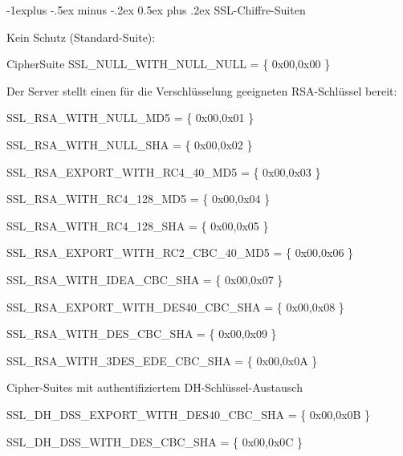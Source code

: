 \documentclass[a4paper]{article}
\makeatletter
\renewcommand{\subsection}{\@startsection{subsection}{2}{0mm}%
 {-1explus -.5ex minus -.2ex}%
 {0.5ex plus .2ex}%
 {\normalfont\normalsize\bfseries}}
\makeatother
\begin{document}
\begin{multicols}{3}
\begin{itemize*}
            \subsection{SSL-Chiffre-Suiten}
            \begin{itemize*}
                  \item       Kein Schutz (Standard-Suite):
                  \begin{itemize*}
                        \item CipherSuite SSL\_NULL\_WITH\_NULL\_NULL = \{ 0x00,0x00 \}
                  \end{itemize*}
                  \item       Der Server stellt einen für die Verschlüsselung geeigneten
                  RSA-Schlüssel bereit:
                  \begin{itemize*}
                        \item SSL\_RSA\_WITH\_NULL\_MD5 = \{ 0x00,0x01 \}
                        \item SSL\_RSA\_WITH\_NULL\_SHA = \{ 0x00,0x02 \}
                        \item SSL\_RSA\_EXPORT\_WITH\_RC4\_40\_MD5 = \{ 0x00,0x03 \}
                        \item SSL\_RSA\_WITH\_RC4\_128\_MD5 = \{ 0x00,0x04 \}
                        \item SSL\_RSA\_WITH\_RC4\_128\_SHA = \{ 0x00,0x05 \}
                        \item SSL\_RSA\_EXPORT\_WITH\_RC2\_CBC\_40\_MD5 = \{ 0x00,0x06 \}
                        \item SSL\_RSA\_WITH\_IDEA\_CBC\_SHA = \{ 0x00,0x07 \}
                        \item SSL\_RSA\_EXPORT\_WITH\_DES40\_CBC\_SHA = \{ 0x00,0x08 \}
                        \item SSL\_RSA\_WITH\_DES\_CBC\_SHA = \{ 0x00,0x09 \}
                        \item SSL\_RSA\_WITH\_3DES\_EDE\_CBC\_SHA = \{ 0x00,0x0A \}
                  \end{itemize*}
                  \item       Cipher-Suites mit authentifiziertem DH-Schlüssel-Austausch
                  \begin{itemize*}
                        \item SSL\_DH\_DSS\_EXPORT\_WITH\_DES40\_CBC\_SHA = \{ 0x00,0x0B \}
                        \item SSL\_DH\_DSS\_WITH\_DES\_CBC\_SHA = \{ 0x00,0x0C \}

\end{itemize*}
\end{itemize*}
\end{itemize*}
\end{multicols}
\end{document}
